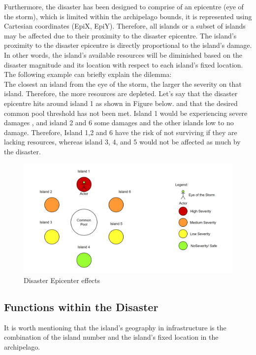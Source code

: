 Furthermore, the disaster has been designed to comprise of an epicentre (eye of the storm), which is limited within the archipelago bounds, it is represented using Cartesian coordinates (EpiX, EpiY). Therefore, all islands or a subset of islands may be affected due to their proximity to the disaster epicentre. The island’s proximity to the disaster epicentre is directly proportional to the island’s damage. In other words, the island's available resources will be diminished based on the disaster magnitude and its location with respect to each island’s fixed location.\\

The following example can briefly explain the dilemma:\\

The closest an island from the eye of the storm, the larger the severity on that island. Therefore, the more resources are depleted. Let’s say that the disaster epicentre hits around island 1 as shown in Figure below. and that the desired common pool threshold has not been met. Island 1 would be experiencing severe damages , and island 2 and 6 some damages and the other islands low to no damage. Therefore, Island 1,2 and 6 have the risk of not surviving if they are lacking resources, whereas island 3, 4, and 5 would not be affected as much by the disaster.

\begin{figure}[!htb]
    \centering
    \includegraphics[width=1\textwidth]{04_environment/Images/Disaster eye of the storm severity.PNG}
    \caption{Disaster Epicenter effects}
    \label{Images:Disaster eye of the storm severity}
\end{figure}

\newpage
\subsection{Functions within the Disaster}
It is worth mentioning that the island's geography in infrastructure is the combination of the island number and the island’s fixed location in the archipelago.\\

